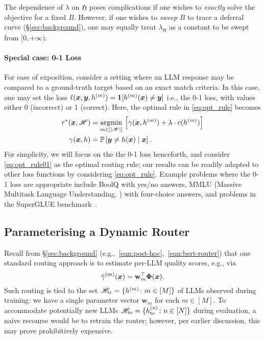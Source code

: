 The dependence of $\lambda$ on $\mathfrak{H}$ poses complications if one wishes to \emph{exactly} solve the objective for a fixed $B$.
However, if one wishes to \emph{sweep} $B$ to trace a deferral curve (\S\ref{sec:background}),
one may equally treat $\lambda_{\mathfrak{H}}$
as a constant to be swept from $[ 0, +\infty )$.

\paragraph{Special case: 0-1 Loss}
For ease of exposition, consider a setting where an LLM response 
may be compared 
to a ground-truth
target
based on an exact match criteria. 
In this case, one
may set the loss $\ell(\boldsymbol{x},\boldsymbol{y},h^{(m)})=\bm{1}[h^{(m)}(\boldsymbol{x})\neq\boldsymbol{y}]$
i.e., the 0-1 loss,
with
values either 
0 (incorrect) or 1 (correct).
Here, the optimal rule in \eqref{eq:opt_rule} becomes
\begin{align}
r^{*}(\boldsymbol{x}, \mathscr{H}) &= 
\underset{m\in[ |\mathscr{H}| ]}{\operatorname{argmin}} \, \left[ \gamma( \boldsymbol{x}, h^{(m)} ) +\lambda\cdot c( h^{(m)} ) \right] \label{eq:opt_rule01} \\
\gamma( \boldsymbol{x}, h ) &\stackrel{.}{=} \mathbb{P}\left[\boldsymbol{y}\ne h(\boldsymbol{x})\mid\boldsymbol{x}\right].\nonumber
\end{align}
For simplicity, we will focus on the the 0-1 loss henceforth, and consider
\eqref{eq:opt_rule01} as the optimal routing rule;
our results can be readily adapted to other loss functions
by considering \eqref{eq:opt_rule}.
Example problems where the 0-1 loss are appropriate include
BoolQ \citep{ClaLeeCha2019}
with yes/no answers, 
MMLU (Massive Multitask Language Understanding,
\citet{HenBurBas2021}) with four-choice answers, and 
problems in
the SuperGLUE benchmark~\citep{WanPruNan2019}. 


\subsection{Parameterising a Dynamic Router}
\label{sec:new_llms}

Recall from \S\ref{sec:background} 
(e.g.,~\eqref{eqn:post-hoc},~\eqref{eqn:bert-router})
that one standard routing approach is to
estimate per-LLM quality scores,
e.g., via
$$ \hat{\gamma}^{(m)}( \boldsymbol{x} ) = \mathbf{w}_{m}^\top \boldsymbol{\Phi}( \boldsymbol{x} ). $$
Such routing is tied to the set 
$\mathscr{H}_{\text{tr}} = \{ h^{(m)} \colon m \in [ M ] \}$
of LLMs observed during training:
we have a single parameter vector $\mathbf{w}_{m}$ for each $m \in [ M ]$.
To accommodate potentially new LLMs
$\mathscr{H}_{\mathrm{te}} = \{ h_{\mathrm{te}}^{(n)} \colon n \in [ N ] \}$
during evaluation,
a na\"{i}ve recourse would be to retrain the router;
however, per earlier discussion,
this may prove prohibitively expensive.

